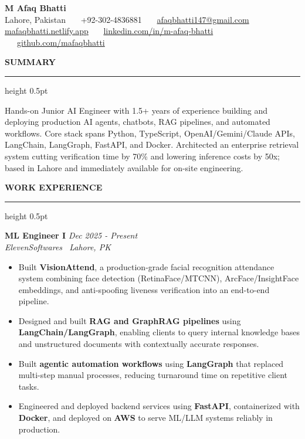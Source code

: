 \documentclass[10pt,letterpaper]{article}
\newcommand{\resumesection}[1]{%
  \vspace{3.0pt}%
  {\fontsize{10pt}{11.5pt}\selectfont\textbf{\MakeUppercase{#1}}}%
  \vspace{1.0pt}%
  \hrule height 0.5pt%
  \vspace{2.0pt}%
}
\begin{document}
\begin{center}
  {\fontsize{17pt}{19pt}\selectfont\textbf{M Afaq Bhatti}}\\[2.5pt]
  {\fontsize{9pt}{10.5pt}\selectfont Lahore, Pakistan \ \textbar\ \ +92-302-4836881 \ \textbar\ \ \href{mailto:afaqbhatti147@gmail.com}{afaqbhatti147@gmail.com}}\\[1.5pt]
  {\fontsize{9pt}{10.5pt}\selectfont \href{https://mafaqbhatti.netlify.app/}{mafaqbhatti.netlify.app} \ \textbar\ \ \href{https://www.linkedin.com/in/m-afaq-bhatti/}{linkedin.com/in/m-afaq-bhatti} \ \textbar\ \ \href{https://github.com/mafaqbhatti}{github.com/mafaqbhatti}}
\end{center}
\vspace{-6pt}

\resumesection{Summary}
Hands-on Junior AI Engineer with 1.5+ years of experience building and deploying production AI agents, chatbots, RAG pipelines, and automated workflows. Core stack spans Python, TypeScript, OpenAI/Gemini/Claude APIs, LangChain, LangGraph, FastAPI, and Docker. Architected an enterprise retrieval system cutting verification time by 70\% and lowering inference costs by 50x; based in Lahore and immediately available for on-site engineering.

\resumesection{Work Experience}
\noindent\textbf{ML Engineer I} \hfill \textit{Dec 2025 - Present} \\
\textit{ElevenSoftwares \textbar\ Lahore, PK}
\begin{itemize}
  \item Built \textbf{VisionAttend}, a production-grade facial recognition attendance system combining face detection (RetinaFace/MTCNN), ArcFace/InsightFace embeddings, and anti-spoofing liveness verification into an end-to-end pipeline.
  \item Designed and built \textbf{RAG and GraphRAG pipelines} using \textbf{LangChain/LangGraph}, enabling clients to query internal knowledge bases and unstructured documents with contextually accurate responses.
  \item Built \textbf{agentic automation workflows} using \textbf{LangGraph} that replaced multi-step manual processes, reducing turnaround time on repetitive client tasks.
  \item Engineered and deployed backend services using \textbf{FastAPI}, containerized with \textbf{Docker}, and deployed on \textbf{AWS} to serve ML/LLM systems reliably in production.
\end{itemize}
\end{document}
